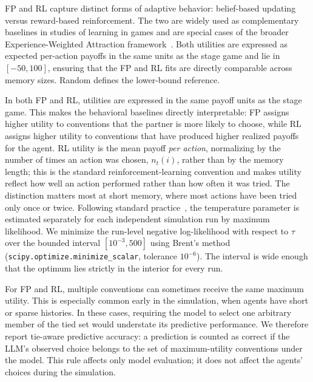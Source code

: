 \documentclass{article}
\begin{document}
\begin{table}[htbp]
\begin{threeparttable}
\begin{tablenotes}[flushleft]
\footnotesize
\item FP and RL capture distinct forms of adaptive behavior: belief-based updating versus reward-based reinforcement. The two are widely used as complementary baselines in studies of learning in games and are special cases of the broader Experience-Weighted Attraction framework~\cite{camerer1999ewa}. Both utilities are expressed as expected per-action payoffs in the same units as the stage game and lie in $[-50, 100]$, ensuring that the FP and RL fits are directly comparable across memory sizes. Random defines the lower-bound reference.
\end{tablenotes}
\end{threeparttable}
\end{table}

In both FP and RL, utilities are expressed in the same payoff units as the stage game. This makes the behavioral baselines directly interpretable: FP assigns higher utility to conventions that the partner is more likely to choose, while RL assigns higher utility to conventions that have produced higher realized payoffs for the agent. RL utility is the mean payoff \emph{per action}, normalizing by the number of times an action was chosen, $n_t(i)$, rather than by the memory length; this is the standard reinforcement-learning convention and makes utility reflect how well an action performed rather than how often it was tried. The distinction matters most at short memory, where most actions have been tried only once or twice. Following standard practice~\cite{camerer1999ewa,erev1998predicting}, the temperature parameter is estimated separately for each independent simulation run by maximum likelihood. We minimize the run-level negative log-likelihood with respect to $\tau$ over the bounded interval $[10^{-3}, 500]$ using Brent's method (\texttt{scipy.optimize.minimize\_scalar}, tolerance $10^{-6}$). The interval is wide enough that the optimum lies strictly in the interior for every run.

For FP and RL, multiple conventions can sometimes receive the same maximum utility. This is especially common early in the simulation, when agents have short or sparse histories. In these cases, requiring the model to select one arbitrary member of the tied set would understate its predictive performance. We therefore report tie-aware predictive accuracy: a prediction is counted as correct if the LLM's observed choice belongs to the set of maximum-utility conventions under the model. This rule affects only model evaluation; it does not affect the agents' choices during the simulation.
\end{document}
